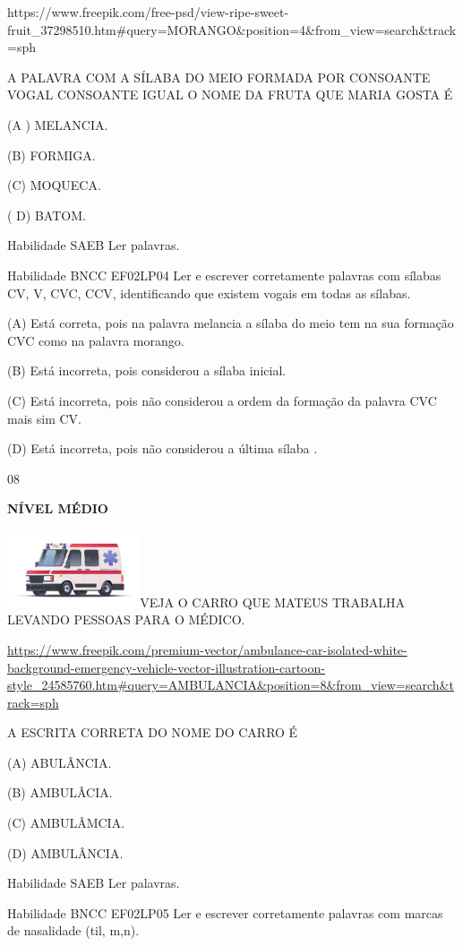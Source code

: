 {{https://www.freepik.com/free-psd/view-ripe-sweet-fruit\_37298510.htm\#query=MORANGO\&position=4\&from\_view=search\&track=sph

\protect\hypertarget{_Hlk129368984}{}{}A PALAVRA COM A SÍLABA DO MEIO
FORMADA POR CONSOANTE VOGAL CONSOANTE IGUAL O NOME DA FRUTA QUE MARIA
GOSTA É

(A ) MELANCIA.

(B) FORMIGA.

(C) MOQUECA.

( D) BATOM.

\protect\hypertarget{_Hlk129369076}{}{} Habilidade SAEB Ler palavras.

Habilidade BNCC EF02LP04 Ler e escrever corretamente palavras com
sílabas CV, V, CVC, CCV, identificando que existem vogais em todas as
sílabas.

(A) Está correta, pois na palavra melancia a sílaba do meio tem na sua
formação CVC como na palavra morango.

(B) Está incorreta, pois considerou a sílaba inicial.

(C) Está incorreta, pois não considerou a ordem da formação da palavra
CVC mais sim CV.

(D) Está incorreta, pois não considerou a última sílaba .

\num{08}

\textbf{NÍVEL MÉDIO}

\includegraphics[width=1.54514in,height=0.89444in]{media/image153.jpeg}VEJA
O CARRO QUE MATEUS TRABALHA LEVANDO PESSOAS PARA O MÉDICO.

\url{https://www.freepik.com/premium-vector/ambulance-car-isolated-white-background-emergency-vehicle-vector-illustration-cartoon-style_24585760.htm\#query=AMBULANCIA\&position=8\&from_view=search\&track=sph}

A ESCRITA CORRETA DO NOME DO CARRO É

(A) ABULÂNCIA.

(B) AMBULÂCIA.

(C) AMBULÂMCIA.

(D) AMBULÂNCIA.

\protect\hypertarget{_Hlk129375149}{}{}Habilidade SAEB Ler palavras.

Habilidade BNCC EF02LP05 Ler e escrever corretamente palavras com marcas
de nasalidade (til, m,n).

}}
